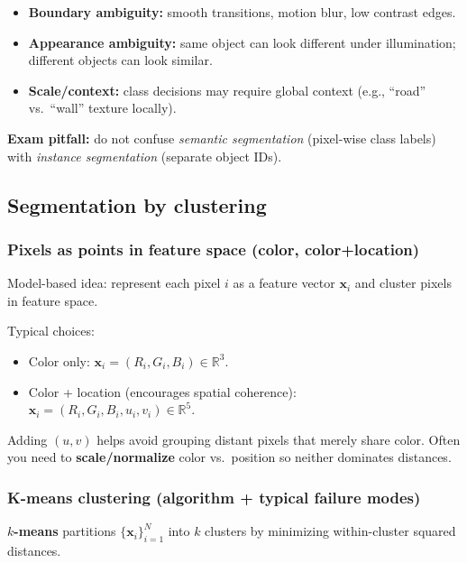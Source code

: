\documentclass[11pt,a4paper]{article}
\newcommand{\R}{\mathbb{R}}
\newcommand{\vct}[1]{\bm{#1}}
\begin{document}
\begin{itemize}
  \item \textbf{Boundary ambiguity:} smooth transitions, motion blur, low contrast edges.
  \item \textbf{Appearance ambiguity:} same object can look different under illumination; different objects can look similar.
  \item \textbf{Scale/context:} class decisions may require global context (e.g., ``road'' vs.\ ``wall'' texture locally).
\end{itemize}

\begin{qbox}
\textbf{Exam pitfall:} do not confuse \emph{semantic segmentation} (pixel-wise class labels) with \emph{instance segmentation} (separate object IDs).
\end{qbox}


\subsection{Segmentation by clustering}

\subsubsection{Pixels as points in feature space (color, color+location)}
\begin{defbox}
Model-based idea: represent each pixel $i$ as a feature vector $\vct{x}_i$ and cluster pixels in feature space.
\end{defbox}

Typical choices:
\begin{itemize}
  \item Color only: $\vct{x}_i = (R_i,G_i,B_i)\in\R^3$.
  \item Color + location (encourages spatial coherence): $\vct{x}_i = (R_i,G_i,B_i,u_i,v_i)\in\R^5$.
\end{itemize}

\begin{notebox}
Adding $(u,v)$ helps avoid grouping distant pixels that merely share color.
Often you need to \textbf{scale/normalize} color vs.\ position so neither dominates distances.
\end{notebox}

\subsubsection{K-means clustering (algorithm + typical failure modes)}
\begin{defbox}
\textbf{$k$-means} partitions $\{\vct{x}_i\}_{i=1}^N$ into $k$ clusters by minimizing within-cluster squared distances.
\end{defbox}
\end{document}
